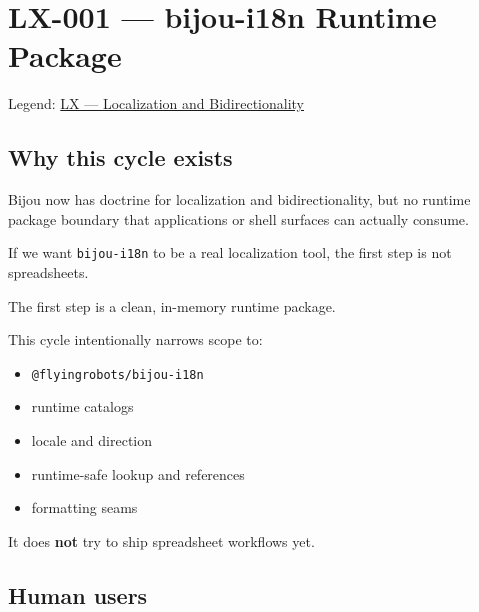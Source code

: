 \chapter{LX-001 --- bijou-i18n Runtime Package}\label{record-188}

\smallskip

Legend: \href{https://github.com/flyingrobots/bijou/blob/1853ad902f6bf219326409e7f743a5a1d6517dbc/docs/legends/LX-localization-and-bidirectionality.md}{LX --- Localization and Bidirectionality}

\section{Why this cycle exists}\label{record-188-why-this-cycle-exists}

Bijou now has doctrine for localization and bidirectionality, but no runtime package boundary that applications or shell surfaces can actually consume.

If we want \texttt{b\allowbreak{}i\allowbreak{}j\allowbreak{}o\allowbreak{}u\allowbreak{}-\allowbreak{}i\allowbreak{}1\allowbreak{}8\allowbreak{}n} to be a real localization tool, the first step is not spreadsheets.

The first step is a clean, in-memory runtime package.

This cycle intentionally narrows scope to:

\begin{itemize}
\tightlist
\item
  \texttt{@\allowbreak{}f\allowbreak{}l\allowbreak{}y\allowbreak{}i\allowbreak{}n\allowbreak{}g\allowbreak{}r\allowbreak{}o\allowbreak{}b\allowbreak{}o\allowbreak{}t\allowbreak{}s\allowbreak{}/\allowbreak{}b\allowbreak{}i\allowbreak{}j\allowbreak{}o\allowbreak{}u\allowbreak{}-\allowbreak{}i\allowbreak{}1\allowbreak{}8\allowbreak{}n}
\item
  runtime catalogs
\item
  locale and direction
\item
  runtime-safe lookup and references
\item
  formatting seams
\end{itemize}

It does \textbf{not} try to ship spreadsheet workflows yet.

\section{Human users}\label{record-188-human-users}

